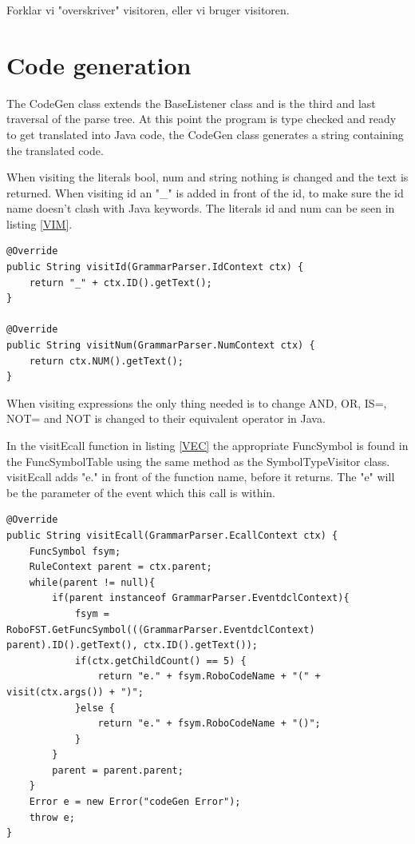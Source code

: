 Forklar vi "overskriver" visitoren, eller vi bruger visitoren.
\section{Code generation}
The CodeGen class extends the BaseListener class and is the third and last traversal of the parse tree. At this point the program is type checked and ready to get translated into Java code, the CodeGen class generates a string containing the translated code. 

When visiting the literals bool, num and string nothing is changed and the text is returned. When visiting id an "\_" is added in front of the id, to make sure the id name doesn't clash with Java keywords. The literals id and num can be seen in listing \ref{VIM}. 

\begin{lstlisting}[caption={CodeGen - visitId \& visitNum functions}, label={VIM}]
@Override
public String visitId(GrammarParser.IdContext ctx) {
    return "_" + ctx.ID().getText();
}

@Override
public String visitNum(GrammarParser.NumContext ctx) {
    return ctx.NUM().getText();
}
\end{lstlisting}

When visiting expressions the only thing needed is to change AND, OR, IS=, NOT= and NOT is changed to their equivalent operator in Java. 

In the visitEcall function in listing \ref{VEC} the appropriate FuncSymbol is found in the FuncSymbolTable using the same method as the SymbolTypeVisitor class. visitEcall adds "e." in front of the function name, before it returns. The "e" will be the parameter of the event which this call is within. 

\begin{lstlisting}[caption={CodeGen - visitEcall function}, label={VEC}]
@Override
public String visitEcall(GrammarParser.EcallContext ctx) {
    FuncSymbol fsym;
    RuleContext parent = ctx.parent;
    while(parent != null){
        if(parent instanceof GrammarParser.EventdclContext){
            fsym = RoboFST.GetFuncSymbol(((GrammarParser.EventdclContext) parent).ID().getText(), ctx.ID().getText());
            if(ctx.getChildCount() == 5) {
                return "e." + fsym.RoboCodeName + "(" + visit(ctx.args()) + ")";
            }else {
                return "e." + fsym.RoboCodeName + "()";
            }
        }
        parent = parent.parent;
    }
    Error e = new Error("codeGen Error");
    throw e;
}
\end{lstlisting}

